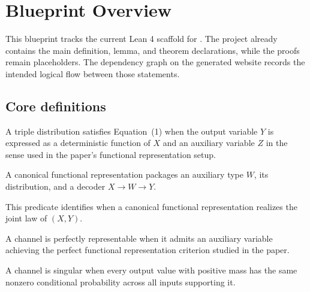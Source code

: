 \chapter{Blueprint Overview}

This blueprint tracks the current Lean 4 scaffold for \paperTitle. The project already contains the main definition, lemma, and theorem declarations, while the proofs remain placeholders. The dependency graph on the generated website records the intended logical flow between those statements.

\section{Core definitions}

\begin{definition}[Equation (1)]
\label{def:eq1}
A triple distribution satisfies Equation~(1) when the output variable $Y$ is expressed as a deterministic function of $X$ and an auxiliary variable $Z$ in the sense used in the paper's functional representation setup.
\end{definition}

\begin{definition}
\label{def:canonical-representation}
A canonical functional representation packages an auxiliary type $W$, its distribution, and a decoder $X \to W \to Y$.
\end{definition}

\begin{definition}
\label{def:canonicality}
This predicate identifies when a canonical functional representation realizes the joint law of $(X,Y)$.
\end{definition}

\begin{definition}
\label{def:perfect-representability}
A channel is perfectly representable when it admits an auxiliary variable achieving the perfect functional representation criterion studied in the paper.
\end{definition}

\begin{definition}
\label{def:singular-channel}
A channel is singular when every output value with positive mass has the same nonzero conditional probability across all inputs supporting it.
\end{definition}

